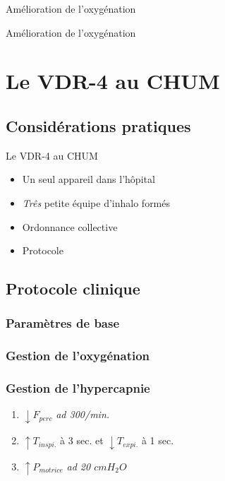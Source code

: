 \documentclass[aspectratio=169]{beamer}
\begin{document}
\begin{frame}{Amélioration de l'oxygénation}
	\centering
	
\end{frame}

\begin{frame}{Amélioration de l'oxygénation}
	\centering
	
\end{frame}

\section{Le VDR-4 au CHUM}

\subsection{Considérations pratiques}

\begin{frame}{Le VDR-4 au CHUM}
	\begin{itemize}
		\item Un seul appareil dans l'hôpital
		\item {\em Três} petite équipe d'inhalo formés
		\item Ordonnance collective
		\item Protocole
	\end{itemize}
\end{frame}


\subsection{Protocole clinique}

\begin{frame}
	\frametitle{Paramètres de base}
	\centering
	
\end{frame}

\begin{frame}
	\frametitle{Gestion de l'oxygénation}
	\centering
	
\end{frame}

\begin{frame}
	\frametitle{Gestion de l'hypercapnie}
	\centering
	\begin{enumerate}
		\item $\downarrow F_{perc}$ \it{ad} 300/min.
		\item $\uparrow T_{inspi.}$ à 3 sec. et $\downarrow T_{expi.}$ à 1 sec.
		\item $\uparrow P_{motrice}$ \it{ad} 20 $cmH_2O$
	\end{enumerate}
\end{frame}
\end{document}
